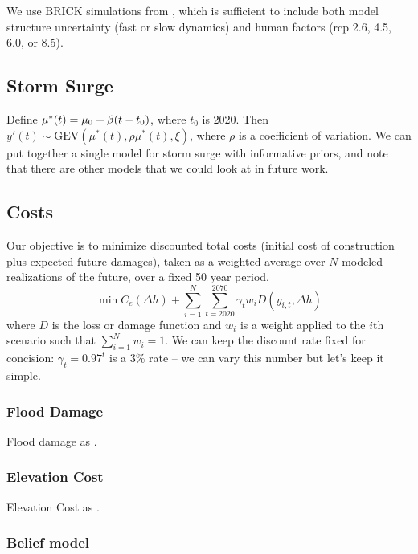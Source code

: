 \documentclass[12pt]{article}
\begin{document}
We use BRICK \citep{wong_brick0.2:2017} simulations from \citet{ruckert_coastal:2019}, which is sufficient to include both model structure uncertainty (fast or slow dynamics) and human factors (\gls{rcp} 2.6, 4.5, 6.0, or 8.5).

\subsection{Storm Surge}\label{sec:methods-surge}

Define $\mu^*(t)=\mu_0 + \beta \qty(t-t_0)$, where $t_0$ is 2020. Then $y'(t) \sim \text{GEV}(\mu^*(t), \rho \mu^*(t), \xi)$, where $\rho$ is a coefficient of variation. We can put together a single model for storm surge with informative priors, and note that there are other models that we could look at in future work.

\subsection{Costs}\label{sec:methods-cost}

Our objective is to minimize discounted total costs (initial cost of construction plus expected future damages), taken as a weighted average over $N$ modeled realizations of the future, over a fixed 50 year period.
$$\min C_e(\Delta h) + \sum_{i=1}^N \sum_{t=2020}^{2070} \gamma_t w_i D(y_{i,t}, \Delta h) $$
where $D$ is the loss or damage function and $w_i$ is a weight applied to the $i$th scenario such that $\sum_{i=1}^N w_i = 1$.
We can keep the discount rate fixed for concision: $\gamma_t = 0.97^t$ is a 3\% rate -- we can vary this number but let's keep it simple.

\subsubsection{Flood Damage}\label{sec:methods-cost-damage}

Flood damage as \citet{zarekarizi_suboptimal:2020}.

\subsubsection{Elevation Cost}\label{sec:methods-cost-elevation}
Elevation Cost as \citet{zarekarizi_suboptimal:2020}.

\subsubsection{Belief model}
\end{document}
